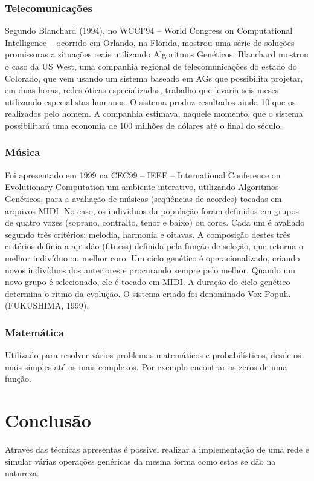 \documentclass[a4paper,11pt]{article}
\begin{document}
\begin{multicols}{2}
\subsubsection{Telecomunicações}
Segundo Blanchard (1994), no WCCI'94 – World Congress on
Computational Intelligence – ocorrido em Orlando, na Flórida, mostrou uma série de soluções promissoras a situações reais utilizando Algoritmos Genéticos. Blanchard mostrou o caso da US West, uma companhia regional de telecomunicações do estado do Colorado, que vem usando um sistema baseado em AGs que possibilita projetar, em duas horas, redes óticas especializadas, trabalho que levaria seis meses utilizando especialistas humanos. O sistema produz resultados ainda 10%
que os realizados pelo homem. A companhia estimava, naquele momento, que o sistema possibilitará uma economia de 100 milhões de dólares até o final do século. \cite{ref:ref_02}

\subsubsection{Música}
Foi apresentado em 1999 na CEC99 – IEEE – International Conference on Evolutionary Computation um ambiente interativo, utilizando Algoritmos
Genéticos, para a avaliação de músicas (seqüências de acordes) tocadas em arquivos MIDI. No caso, os indivíduos da população foram definidos em grupos
de quatro vozes (soprano, contralto, tenor e baixo) ou coros. Cada um é avaliado segundo três critérios: melodia, harmonia e oitavas. A composição
destes três critérios definia a aptidão (fitness) definida pela função de seleção, que retorna o melhor indivíduo ou melhor coro. Um ciclo genético é
operacionalizado, criando novos indivíduos dos anteriores e procurando sempre pelo melhor. Quando um novo grupo é selecionado, ele é tocado em
MIDI. A duração do ciclo genético determina o ritmo da evolução. O sistema criado foi denominado Vox Populi. (FUKUSHIMA, 1999).
\cite{ref:ref_02}

\subsubsection{Matemática}
Utilizado para resolver vários problemas matemáticos e probabilísticos, desde os mais simples até os mais complexos. Por exemplo encontrar os zeros de uma função.

\section{Conclusão}
Através das técnicas apresentas é possível realizar a implementação de uma rede e simular várias operações genéricas da mesma forma como estas se dão na natureza.




\end{multicols}
\end{document}
